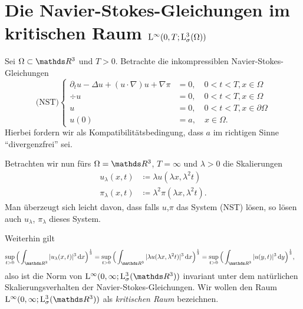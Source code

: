 \chapter{Die Navier-Stokes-Gleichungen im kritischen Raum $\mathrm{L}^\infty(0,T; \mathrm{L}^3_\sigma(\Omega))$}

Sei $\Omega \subset \R^3$ und $T > 0$.
Betrachte die inkompressiblen Navier-Stokes-Gleichungen
$$
\text{(NST)} \begin{cases}
  \partial_t u - \Delta u + (u \cdot \nabla) u + \nabla \pi &= 0, \quad 0 < t < T, x \in \Omega \\
  \div u &= 0, \quad 0 < t < T, x \in \Omega \\
  u &= 0, \quad 0 < t < T, x \in \partial\Omega \\
  u(0) &= a, \quad x \in \Omega.
\end{cases}
$$
Hierbei fordern wir als Kompatibilitätsbedingung, dass $a$ im richtigen Sinne ``divergenzfrei'' sei.

Betrachten wir nun fürs $\Omega = \R^3$, $T = \infty$ und $\lambda > 0$ die Skalierungen
\begin{align*}
  u_\lambda(x,t)  &\coloneqq \lambda u(\lambda x, \lambda^2 t) \\
  \pi_\lambda(x,t) &\coloneqq \lambda^2 \pi(\lambda x, \lambda^2 t).
\end{align*}
Man überzeugt sich leicht davon, dass falls $u$,$\pi$ das System (NST) lösen, so lösen auch $u_\lambda$, $\pi_\lambda$ dieses System.

Weiterhin gilt
\begin{align*}
  \sup_{t > 0} \Big( \int_{\R^3} |u_\lambda(x,t)|^3 \d x \Big)^{\frac{1}{3}} 
  &= \sup_{t > 0} \Big( \int_{\R^3} |\lambda u (\lambda x, \lambda^2 t) |^3 \d x \Big)^{\frac{1}{3}} 
  = \sup_{t > 0} \Big( \int_{\R^3} |u(y,t)|^3 \d y \Big)^{\frac{1}{3}},
  \end{align*}
also ist die Norm von $\Ell^\infty(0,\infty; \Ell_\sigma^3(\R^3))$ invariant unter dem natürlichen Skalierungsverhalten der Navier-Stokes-Gleichungen.
Wir wollen den Raum $\Ell^\infty(0,\infty; \Ell^3_\sigma(\R^3))$ als \emph{kritischen Raum} bezeichnen.

